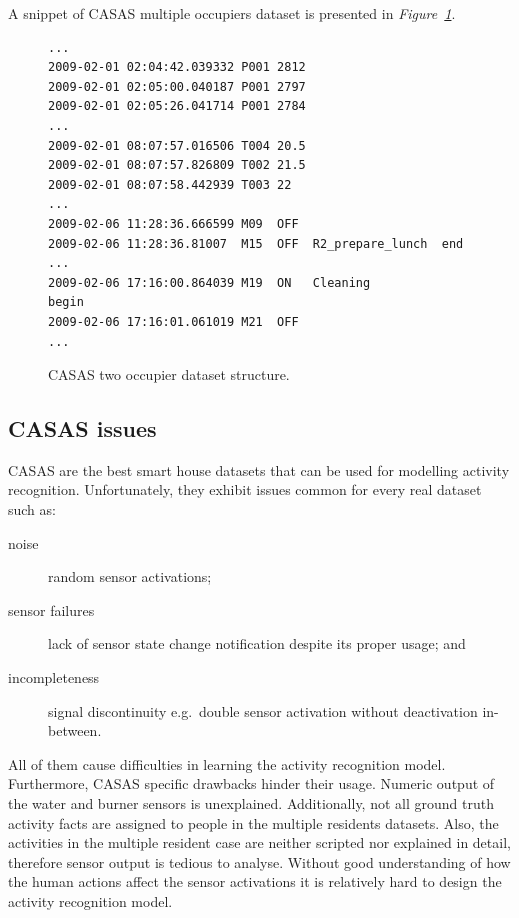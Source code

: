 \documentclass[10pt, a4paper, pdflatex, leqno, twoside, openright]{report}
\begin{document}
A snippet of CASAS multiple occupiers dataset is presented in \emph{Figure~\ref{lst:CASAStwoR}}.
\begin{figure}[htb]
  \begin{lstlisting}
...
2009-02-01 02:04:42.039332 P001 2812
2009-02-01 02:05:00.040187 P001 2797
2009-02-01 02:05:26.041714 P001 2784
...
2009-02-01 08:07:57.016506 T004 20.5
2009-02-01 08:07:57.826809 T002 21.5
2009-02-01 08:07:58.442939 T003 22
...
2009-02-06 11:28:36.666599 M09  OFF
2009-02-06 11:28:36.81007  M15  OFF  R2_prepare_lunch  end
...
2009-02-06 17:16:00.864039 M19  ON   Cleaning          begin
2009-02-06 17:16:01.061019 M21  OFF
...
  \end{lstlisting}
  \caption{CASAS two occupier dataset structure.\label{lst:CASAStwoR}}
\end{figure}

    \subsection{CASAS issues\label{sec:dataIssues}}
CASAS are the best smart house datasets that can be used for modelling activity recognition. Unfortunately, they exhibit issues common for every real dataset such as:
\begin{description}
\item[noise] random sensor activations;
\item[sensor failures] lack of sensor state change notification despite its proper usage; and
\item[incompleteness] signal discontinuity e.g.\ double sensor activation without deactivation in-between.
\end{description}
All of them cause difficulties in learning the activity recognition model.\\

Furthermore, CASAS specific drawbacks hinder their usage. Numeric output of the water and burner sensors is unexplained. Additionally, not all ground truth activity facts are assigned to people in the multiple residents datasets. Also, the activities in the multiple resident case are neither scripted nor explained in detail, therefore sensor output is tedious to analyse. Without good understanding of how the human actions affect the sensor activations it is relatively hard to design the activity recognition model.\\
\end{document}
